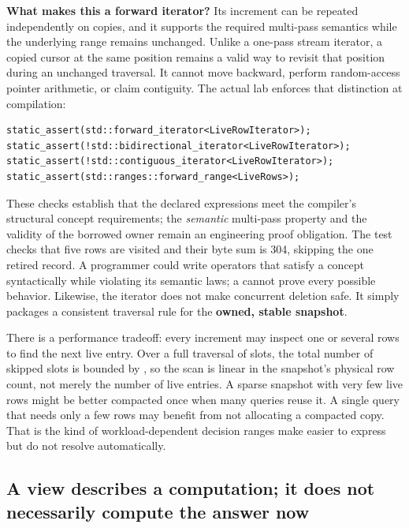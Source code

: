 \textbf{What makes this a forward iterator?} Its increment can be repeated independently on copies, and it supports the required multi-pass semantics while the underlying range remains unchanged. Unlike a one-pass stream iterator, a copied cursor at the same position remains a valid way to revisit that position during an unchanged traversal. It cannot move backward, perform random-access pointer arithmetic, or claim contiguity. The actual lab enforces that distinction at compilation:

\begin{verbatim}
static_assert(std::forward_iterator<LiveRowIterator>);
static_assert(!std::bidirectional_iterator<LiveRowIterator>);
static_assert(!std::contiguous_iterator<LiveRowIterator>);
static_assert(std::ranges::forward_range<LiveRows>);
\end{verbatim}

These checks establish that the declared expressions meet the compiler's structural concept requirements; the \emph{semantic} multi-pass property and the validity of the borrowed owner remain an engineering proof obligation. The test checks that five rows are visited and their byte sum is 304, skipping the one retired record. A programmer could write operators that satisfy a concept syntactically while violating its semantic laws; a  cannot prove every possible behavior. Likewise, the iterator does not make concurrent deletion safe. It simply packages a consistent traversal rule for the \textbf{owned, stable snapshot}.

There is a performance tradeoff: every increment may inspect one or several rows to find the next live entry. Over a full traversal of  slots, the total number of skipped slots is bounded by , so the scan is linear in the snapshot's physical row count, not merely the number of live entries. A sparse snapshot with very few live rows might be better compacted once when many queries reuse it. A single query that needs only a few rows may benefit from not allocating a compacted copy. That is the kind of workload-dependent decision ranges make easier to express but do not resolve automatically.

\subsection{A view describes a computation; it does not necessarily compute the answer now}\label{05-engine-i-ch006-a-view-describes-a-computation-it-does-not-necessarily-compute-the-answer-now}

